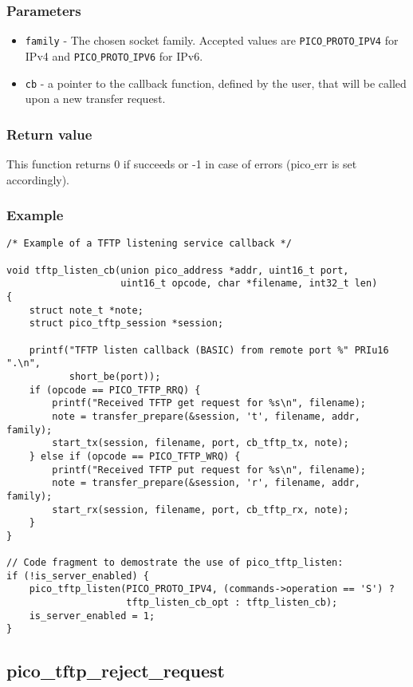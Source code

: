 \subsubsection*{Parameters}
\begin{itemize}[noitemsep]
\item \texttt{family} - The chosen socket family. Accepted values are \texttt{PICO$\_$PROTO$\_$IPV4} for IPv4 and \texttt{PICO$\_$PROTO$\_$IPV6} for IPv6.
\item \texttt{cb} - a pointer to the callback function, defined by the user, that will be called upon a new transfer request.
\end{itemize}

\subsubsection*{Return value}
This function returns 0 if succeeds or -1 in case of errors (pico$\_$err is set accordingly).

\subsubsection*{Example}
\begin{verbatim}
/* Example of a TFTP listening service callback */

void tftp_listen_cb(union pico_address *addr, uint16_t port,
                    uint16_t opcode, char *filename, int32_t len)
{
    struct note_t *note;
    struct pico_tftp_session *session;

    printf("TFTP listen callback (BASIC) from remote port %" PRIu16 ".\n",
           short_be(port));
    if (opcode == PICO_TFTP_RRQ) {
        printf("Received TFTP get request for %s\n", filename);
        note = transfer_prepare(&session, 't', filename, addr, family);
        start_tx(session, filename, port, cb_tftp_tx, note);
    } else if (opcode == PICO_TFTP_WRQ) {
        printf("Received TFTP put request for %s\n", filename);
        note = transfer_prepare(&session, 'r', filename, addr, family);
        start_rx(session, filename, port, cb_tftp_rx, note);
    }
}

// Code fragment to demostrate the use of pico_tftp_listen:
if (!is_server_enabled) {
    pico_tftp_listen(PICO_PROTO_IPV4, (commands->operation == 'S') ?
                     tftp_listen_cb_opt : tftp_listen_cb);
    is_server_enabled = 1;
}
\end{verbatim}


\subsection{pico\_tftp\_reject\_request}

